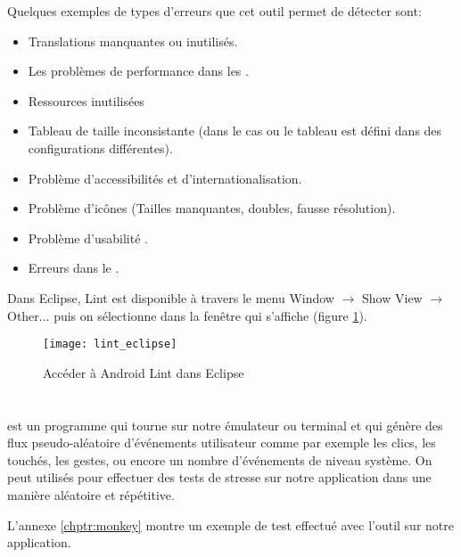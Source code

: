Quelques exemples de types d'erreurs que cet outil permet de détecter sont:

\begin{itemize}

\item Translations manquantes ou inutilisés.

\item Les problèmes de performance dans les .

\item Ressources inutilisées

\item Tableau de taille inconsistante (dans le cas ou le tableau est défini dans des configurations différentes).

\item Problème d'accessibilités et d'internationalisation.

\item Problème d'icônes (Tailles manquantes, doubles, fausse résolution).

\item Problème d'usabilité .

\item Erreurs dans le .

\end{itemize}

Dans Eclipse, \android{} Lint est disponible à travers le menu Window $\rightarrow$ Show View $\rightarrow$ Other... puis on sélectionne  dans la fenêtre qui s'affiche (figure \ref{fig:lint_eclipse}).

\begin{figure}
\center
\texttt{[image: lint\_eclipse]}
\caption{Accéder à Android Lint dans Eclipse}
\label{fig:lint_eclipse}
\end{figure}

\section[UI/Application Exerciser Monkey]{}

 \cite{tools:monkey} est un programme qui tourne sur notre émulateur ou terminal \android{} et qui génère des flux pseudo-aléatoire d’événements utilisateur comme par exemple les clics, les touchés, les gestes, ou encore un nombre d’événements de niveau système. On peut utilisés  pour effectuer des tests de stresse sur notre application dans une manière aléatoire et répétitive.

L'annexe \ref{chptr:monkey} montre un exemple de test effectué avec l'outil  sur notre application.